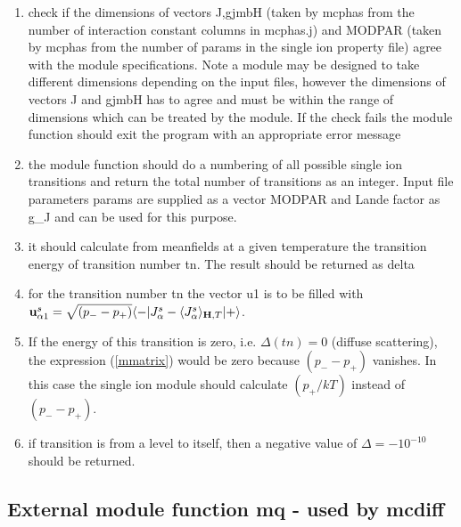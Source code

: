 \begin{enumerate}
\item check if the dimensions of vectors J,gjmbH (taken by {\prg mcphas} from the number of 
interaction constant columns in {\prg mcphas.j})
 and MODPAR (taken by {\prg mcphas} from the number of params in the single ion property
file) agree with the module specifications. Note a module may be designed to 
take different dimensions depending on the input files, however the dimensions
of vectors J and gjmbH has to agree and must be within the range of dimensions which
can be treated by the module. If the check fails the module function should exit the
program with an appropriate error message
\item the module function should do a numbering of all possible single ion transitions and return
the total number of transitions as an integer. Input file parameters params are supplied as a vector MODPAR and
Lande factor as g\_J and  can be used for this purpose.
\item it should calculate from meanfields at a given temperature the 
transition energy of transition number {\prg tn}. The result should be returned as {\prg delta}
\item for the transition number tn the vector u1 is to be filled with ${\mathbf u^s_{\alpha1}}=\sqrt{(p_--p_+)}\langle -|J^s_{\alpha}-\langle J^s_{\alpha}\rangle_{\mathbf H,T}|+\rangle$.
\item
If the energy of this transition
is zero, i.e. $\Delta(tn)=0$ (diffuse scattering), 
the expression (\ref{mmatrix}) would be zero because $(p_--p_+)$ vanishes.
In this case the single ion module should calculate $(p_+/kT)$ instead of $(p_--p_+)$.
\item if transition is from a level to itself, then a negative value of $\Delta=-10^{-10}$ should be returned.
\end{enumerate}

\subsection{External module function {\prg mq} - used by {\prg mcdiff}  }

